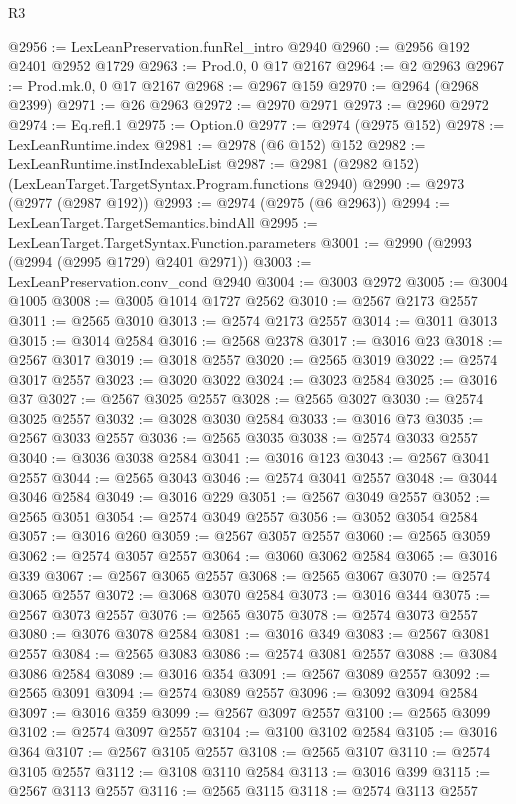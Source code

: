\begin{lexlean}{R3}
\begin{coremodule}
@2956 := LexLeanPreservation.funRel_intro @2940
@2960 := @2956 @192 @2401 @2952 @1729
@2963 := Prod.{0, 0} @17 @2167
@2964 := @2 @2963
@2967 := Prod.mk.{0, 0} @17 @2167
@2968 := @2967 @159
@2970 := @2964 (@2968 @2399)
@2971 := @26 @2963
@2972 := @2970 @2971
@2973 := @2960 @2972
@2974 := Eq.refl.{1}
@2975 := Option.{0}
@2977 := @2974 (@2975 @152)
@2978 := LexLeanRuntime.index
@2981 := @2978 (@6 @152) @152
@2982 := LexLeanRuntime.instIndexableList
@2987 := @2981 (@2982 @152) (LexLeanTarget.TargetSyntax.Program.functions @2940)
@2990 := @2973 (@2977 (@2987 @192))
@2993 := @2974 (@2975 (@6 @2963))
@2994 := LexLeanTarget.TargetSemantics.bindAll
@2995 := LexLeanTarget.TargetSyntax.Function.parameters
@3001 := @2990 (@2993 (@2994 (@2995 @1729) @2401 @2971))
@3003 := LexLeanPreservation.conv_cond @2940
@3004 := @3003 @2972
@3005 := @3004 @1005
@3008 := @3005 @1014 @1727 @2562
@3010 := @2567 @2173 @2557
@3011 := @2565 @3010
@3013 := @2574 @2173 @2557
@3014 := @3011 @3013
@3015 := @3014 @2584
@3016 := @2568 @2378
@3017 := @3016 @23
@3018 := @2567 @3017
@3019 := @3018 @2557
@3020 := @2565 @3019
@3022 := @2574 @3017 @2557
@3023 := @3020 @3022
@3024 := @3023 @2584
@3025 := @3016 @37
@3027 := @2567 @3025 @2557
@3028 := @2565 @3027
@3030 := @2574 @3025 @2557
@3032 := @3028 @3030 @2584
@3033 := @3016 @73
@3035 := @2567 @3033 @2557
@3036 := @2565 @3035
@3038 := @2574 @3033 @2557
@3040 := @3036 @3038 @2584
@3041 := @3016 @123
@3043 := @2567 @3041 @2557
@3044 := @2565 @3043
@3046 := @2574 @3041 @2557
@3048 := @3044 @3046 @2584
@3049 := @3016 @229
@3051 := @2567 @3049 @2557
@3052 := @2565 @3051
@3054 := @2574 @3049 @2557
@3056 := @3052 @3054 @2584
@3057 := @3016 @260
@3059 := @2567 @3057 @2557
@3060 := @2565 @3059
@3062 := @2574 @3057 @2557
@3064 := @3060 @3062 @2584
@3065 := @3016 @339
@3067 := @2567 @3065 @2557
@3068 := @2565 @3067
@3070 := @2574 @3065 @2557
@3072 := @3068 @3070 @2584
@3073 := @3016 @344
@3075 := @2567 @3073 @2557
@3076 := @2565 @3075
@3078 := @2574 @3073 @2557
@3080 := @3076 @3078 @2584
@3081 := @3016 @349
@3083 := @2567 @3081 @2557
@3084 := @2565 @3083
@3086 := @2574 @3081 @2557
@3088 := @3084 @3086 @2584
@3089 := @3016 @354
@3091 := @2567 @3089 @2557
@3092 := @2565 @3091
@3094 := @2574 @3089 @2557
@3096 := @3092 @3094 @2584
@3097 := @3016 @359
@3099 := @2567 @3097 @2557
@3100 := @2565 @3099
@3102 := @2574 @3097 @2557
@3104 := @3100 @3102 @2584
@3105 := @3016 @364
@3107 := @2567 @3105 @2557
@3108 := @2565 @3107
@3110 := @2574 @3105 @2557
@3112 := @3108 @3110 @2584
@3113 := @3016 @399
@3115 := @2567 @3113 @2557
@3116 := @2565 @3115
@3118 := @2574 @3113 @2557

\end{coremodule}
\end{lexlean}
